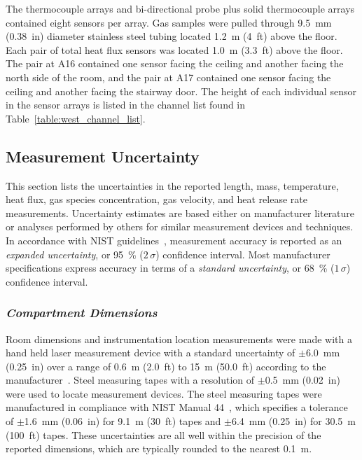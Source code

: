 The thermocouple arrays and bi-directional probe plus solid thermocouple arrays contained eight sensors per array. Gas samples were pulled through 9.5~mm (0.38~in) diameter stainless steel tubing located 1.2~m (4~ft) above the floor. Each pair of total heat flux sensors was located 1.0~m (3.3~ft) above the floor. The pair at A16 contained one sensor facing the ceiling and another facing the north side of the room, and the pair at A17 contained one sensor facing the ceiling and another facing the stairway door. The height of each individual sensor in the sensor arrays is listed in the channel list found in Table~\ref{table:west_channel_list}.
\FloatBarrier

\subsection{Measurement Uncertainty}
This section lists the uncertainties in the reported length, mass, temperature, heat flux, gas species concentration, gas velocity, and heat release rate measurements. Uncertainty estimates are based either on manufacturer literature or analyses performed by others for similar measurement devices and techniques. In accordance with NIST guidelines~\cite{Taylor&Kuyatt:1994}, measurement accuracy is reported as an \textit{expanded uncertainty}, or 95~\% ($2\,\sigma$) confidence interval. Most manufacturer specifications express accuracy in terms of a \textit{standard  uncertainty}, or 68~\% ($1\,\sigma$) confidence interval.

\subsubsection*{\textit{Compartment Dimensions}}
Room dimensions and instrumentation location measurements were made with a hand held laser measurement device with a standard uncertainty of $\pm$6.0~mm (0.25~in) over a range of 0.6~m (2.0~ft) to 15~m (50.0~ft) according to the manufacturer~\cite{StanleyTools}. Steel measuring tapes with a resolution of $\pm$0.5~mm (0.02~in) were used to locate measurement devices. The steel measuring tapes were manufactured in compliance with NIST Manual 44~\cite{Butcher:2012}, which specifies a tolerance of $\pm$1.6~mm (0.06~in) for 9.1~m (30~ft) tapes and $\pm$6.4~mm (0.25~in) for 30.5~m (100~ft) tapes. These uncertainties are all well within the precision of the reported dimensions, which are typically rounded to the nearest 0.1~m.

